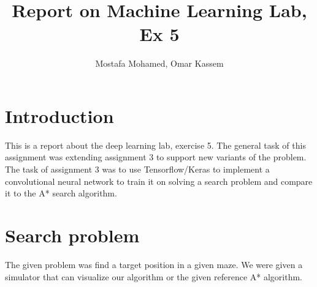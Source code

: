 \documentclass[a4paper]{article}
\begin{document}

\title{Report on Machine Learning Lab, Ex 5} %


\author{Mostafa Mohamed, Omar Kassem}%



\maketitle %




\section{Introduction}
This is a report about the deep learning lab, exercise 5. The general task of this assignment was extending assignment 3 to support new variants of the problem. The task of assignment 3 was to use Tensorflow/Keras to implement a convolutional neural network to train it on solving a search problem and compare it to the A* search algorithm.

\section{Search problem}
The given problem was find a target position in a given maze. We were given a simulator that can visualize our algorithm or the given reference A* algorithm. 
\end{document}

